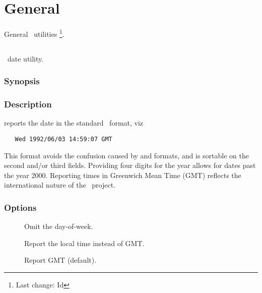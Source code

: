 \chapter{General}
\label{General}

General \aipspp\ utilities \footnote{Last change:
$ $Id$ $}.


\section{}
\label{adate}



\aipspp\ date utility.

\subsection*{Synopsis}

\begin{synopsis}
\end{synopsis}

\subsection*{Description}

 reports the date in the standard \aipspp\ format, viz

\begin{verbatim}
   Wed 1992/06/03 14:59:07 GMT
\end{verbatim}

\noindent
This format avoids the confusion caused by  and 
formats, and is sortable on the second and/or third fields.  Providing four
digits for the year allows for dates past the year 2000.  Reporting times in
Greenwich Mean Time (GMT) reflects the international nature of the \aipspp\ 
project.

\subsection*{Options}

\begin{description}
\item[]
   Omit the day-of-week.

\item[]
   Report the local time instead of GMT.

\item[]
   Report GMT (default).
\end{description}


